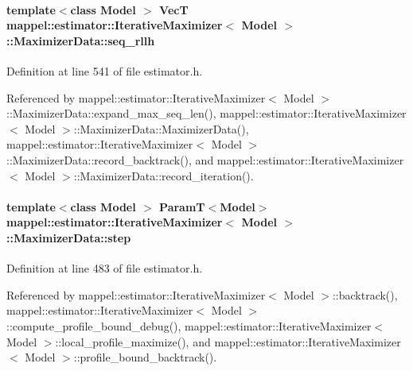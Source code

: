 \paragraph[{\texorpdfstring{seq\+\_\+rllh}{seq_rllh}}]{\setlength{\rightskip}{0pt plus 5cm}template$<$class Model $>$ {\bf VecT} {\bf mappel\+::estimator\+::\+Iterative\+Maximizer}$<$ Model $>$\+::Maximizer\+Data\+::seq\+\_\+rllh\hspace{0.3cm}{\ttfamily [protected]}}\hypertarget{classmappel_1_1estimator_1_1IterativeMaximizer_1_1MaximizerData_ae51783c964589222eb1f88487ba843a1}{}\label{classmappel_1_1estimator_1_1IterativeMaximizer_1_1MaximizerData_ae51783c964589222eb1f88487ba843a1}


Definition at line 541 of file estimator.\+h.



Referenced by mappel\+::estimator\+::\+Iterative\+Maximizer$<$ Model $>$\+::\+Maximizer\+Data\+::expand\+\_\+max\+\_\+seq\+\_\+len(), mappel\+::estimator\+::\+Iterative\+Maximizer$<$ Model $>$\+::\+Maximizer\+Data\+::\+Maximizer\+Data(), mappel\+::estimator\+::\+Iterative\+Maximizer$<$ Model $>$\+::\+Maximizer\+Data\+::record\+\_\+backtrack(), and mappel\+::estimator\+::\+Iterative\+Maximizer$<$ Model $>$\+::\+Maximizer\+Data\+::record\+\_\+iteration().

\paragraph[{\texorpdfstring{step}{step}}]{\setlength{\rightskip}{0pt plus 5cm}template$<$class Model $>$ {\bf ParamT}$<$Model$>$ {\bf mappel\+::estimator\+::\+Iterative\+Maximizer}$<$ Model $>$\+::Maximizer\+Data\+::step}\hypertarget{classmappel_1_1estimator_1_1IterativeMaximizer_1_1MaximizerData_abca4cc72bc3cbf7326c5d4ad040e3821}{}\label{classmappel_1_1estimator_1_1IterativeMaximizer_1_1MaximizerData_abca4cc72bc3cbf7326c5d4ad040e3821}


Definition at line 483 of file estimator.\+h.



Referenced by mappel\+::estimator\+::\+Iterative\+Maximizer$<$ Model $>$\+::backtrack(), mappel\+::estimator\+::\+Iterative\+Maximizer$<$ Model $>$\+::compute\+\_\+profile\+\_\+bound\+\_\+debug(), mappel\+::estimator\+::\+Iterative\+Maximizer$<$ Model $>$\+::local\+\_\+profile\+\_\+maximize(), and mappel\+::estimator\+::\+Iterative\+Maximizer$<$ Model $>$\+::profile\+\_\+bound\+\_\+backtrack().

